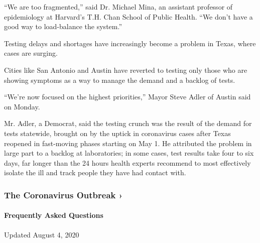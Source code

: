 ``We are too fragmented,'' said Dr. Michael Mina, an assistant professor
of epidemiology at Harvard's T.H. Chan School of Public Health. ``We
don't have a good way to load-balance the system.''

Testing delays and shortages have increasingly become a problem in
Texas, where cases are surging.

Cities like San Antonio and Austin have reverted to testing only those
who are showing symptoms as a way to manage the demand and a backlog of
tests.

``We're now focused on the highest priorities,'' Mayor Steve Adler of
Austin said on Monday.

Mr. Adler, a Democrat, said the testing crunch was the result of the
demand for tests statewide, brought on by the uptick in coronavirus
cases after Texas reopened in fast-moving phases starting on May 1. He
attributed the problem in large part to a backlog at laboratories; in
some cases, test results take four to six days, far longer than the 24
hours health experts recommend to most effectively isolate the ill and
track people they have had contact with.

\href{https://www.nytimes3xbfgragh.onion/news-event/coronavirus?action=click\&pgtype=Article\&state=default\&region=MAIN_CONTENT_3\&context=storylines_faq}{}

\hypertarget{the-coronavirus-outbreak-}{%
\subsubsection{The Coronavirus Outbreak
›}\label{the-coronavirus-outbreak-}}

\hypertarget{frequently-asked-questions}{%
\paragraph{Frequently Asked
Questions}\label{frequently-asked-questions}}

Updated August 4, 2020


